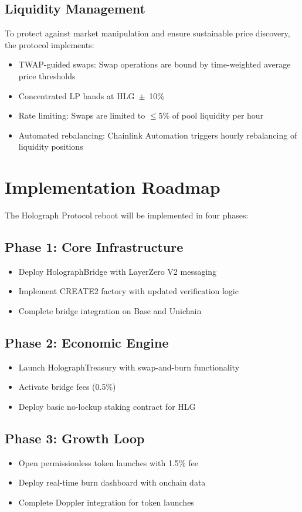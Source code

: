 \documentclass[10pt,a4paper,twocolumn]{article}
\begin{document}
\subsection{Liquidity Management}
To protect against market manipulation and ensure sustainable price discovery, the protocol implements:
\begin{itemize}
  \item TWAP-guided swaps: Swap operations are bound by time-weighted average price thresholds
  \item Concentrated LP bands at HLG~\(\pm\)~10\%
  \item Rate limiting: Swaps are limited to \(\le 5\%\) of pool liquidity per hour
  \item Automated rebalancing: Chainlink Automation triggers hourly rebalancing of liquidity positions
\end{itemize}

\section{Implementation Roadmap}
The Holograph Protocol reboot will be implemented in four phases:

\subsection*{Phase 1: Core Infrastructure}
\begin{itemize}
  \item Deploy HolographBridge with LayerZero V2 messaging
  \item Implement CREATE2 factory with updated verification logic
  \item Complete bridge integration on Base and Unichain
\end{itemize}

\subsection*{Phase 2: Economic Engine}
\begin{itemize}
  \item Launch HolographTreasury with swap-and-burn functionality
  \item Activate bridge fees (0.5\%)
  \item Deploy basic no-lockup staking contract for HLG
\end{itemize}

\subsection*{Phase 3: Growth Loop}
\begin{itemize}
  \item Open permissionless token launches with 1.5\% fee
  \item Deploy real-time burn dashboard with onchain data
  \item Complete Doppler integration for token launches
\end{itemize}
\end{document}
